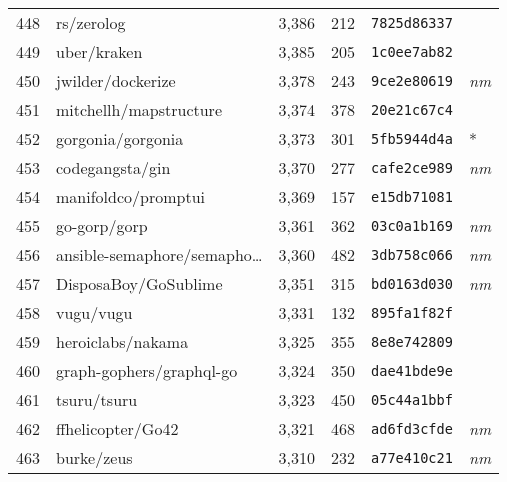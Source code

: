 {\begin{supertabular}{llrrll}
        448 &                         rs/zerolog &  3,386 &    212 &  \texttt{7825d86337} &              \\
        449 &                        uber/kraken &  3,385 &    205 &  \texttt{1c0ee7ab82} &              \\
        450 &                  jwilder/dockerize &  3,378 &    243 &  \texttt{9ce2e80619} &  \textit{nm} \\
        451 &             mitchellh/mapstructure &  3,374 &    378 &  \texttt{20e21c67c4} &              \\
        452 &                  gorgonia/gorgonia &  3,373 &    301 &  \texttt{5fb5944d4a} &            * \\
        453 &                    codegangsta/gin &  3,370 &    277 &  \texttt{cafe2ce989} &  \textit{nm} \\
        454 &                manifoldco/promptui &  3,369 &    157 &  \texttt{e15db71081} &              \\
        455 &                       go-gorp/gorp &  3,361 &    362 &  \texttt{03c0a1b169} &  \textit{nm} \\
        456 &    ansible-semaphore/semapho\ldots &  3,360 &    482 &  \texttt{3db758c066} &  \textit{nm} \\
        457 &               DisposaBoy/GoSublime &  3,351 &    315 &  \texttt{bd0163d030} &  \textit{nm} \\
        458 &                          vugu/vugu &  3,331 &    132 &  \texttt{895fa1f82f} &              \\
        459 &                  heroiclabs/nakama &  3,325 &    355 &  \texttt{8e8e742809} &              \\
        460 &           graph-gophers/graphql-go &  3,324 &    350 &  \texttt{dae41bde9e} &              \\
        461 &                        tsuru/tsuru &  3,323 &    450 &  \texttt{05c44a1bbf} &              \\
        462 &                  ffhelicopter/Go42 &  3,321 &    468 &  \texttt{ad6fd3cfde} &  \textit{nm} \\
        463 &                         burke/zeus &  3,310 &    232 &  \texttt{a77e410c21} &  \textit{nm} \\

\end{supertabular}}

